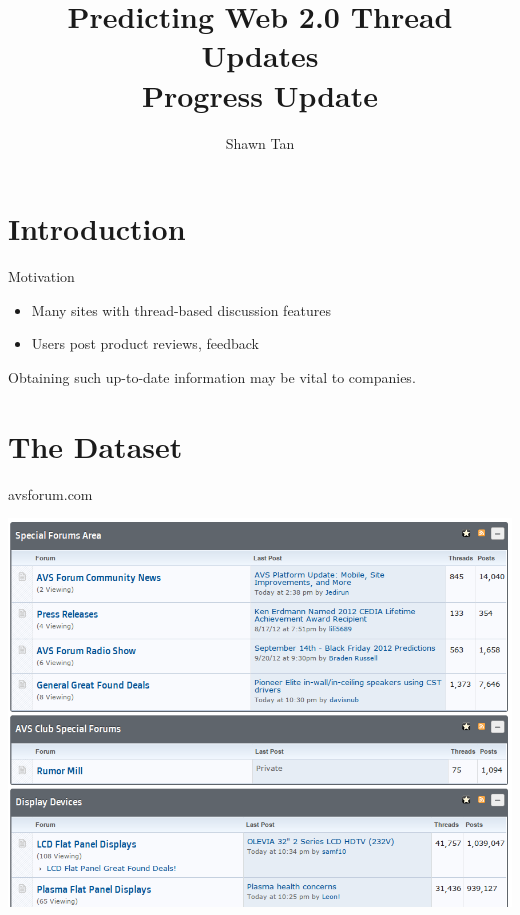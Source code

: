 \documentclass[12pt]{presentation}
\title{Predicting Web 2.0 Thread Updates\\Progress Update}
\author{Shawn Tan}
\date{}
\begin{document}
\maketitle
\section{Introduction}

\begin{frame}{Motivation}
	\begin{itemize}
		\item Many sites with thread-based discussion features
		\item Users post product reviews, feedback
	\end{itemize}
	Obtaining such up-to-date information may be vital to companies.
\end{frame}
\section{The Dataset}
\begin{frame}{avsforum.com}
	\begin{center}
		\includegraphics[scale=0.3]{screenshots/index.png}
	\end{center}
\end{frame}
\end{document}

